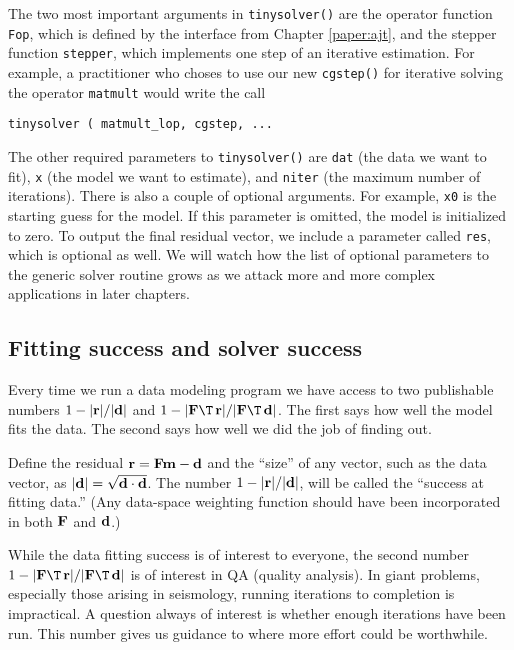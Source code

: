 \par
The two most important arguments in \texttt{tinysolver()}
are the operator function \texttt{Fop},
which is defined by the interface from Chapter \ref{paper:ajt},
and the stepper function \texttt{stepper},
which implements one step of an iterative estimation.
For example, a practitioner who choses to use our new
\texttt{cgstep()} 
for iterative solving the operator
\texttt{matmult} 
would write the call
\par
\texttt{tinysolver ( matmult\_lop, cgstep, ...}
\par
The other required parameters to \texttt{tinysolver()} 
are \texttt{dat} (the data we want to fit),
\texttt{x} (the model we want to estimate),
and \texttt{niter} (the maximum number of iterations).
There is also a couple of optional arguments.
For example, \texttt{x0} is the starting guess for the model.
If this parameter is omitted, the model is initialized to zero.
To output the final residual vector,
we include a parameter called \texttt{res},
which is optional as well.
We will watch how the list of optional parameters
to the generic solver routine grows
as we attack more and more complex applications in later chapters.

\subsection{Fitting success and solver success}
Every time we run a data modeling program
we have access to two publishable numbers
$1-|\bold r|/|\bold d|$ and
$1-|\bold F\T\,\bold r|/|\bold F\T\,\bold d|$.
The first says how well the model fits the data.
The second says how well we did the job of finding out.
\par
Define the residual $\bold r=\bold F\bold m-\bold d$ and
the ``size'' of any vector, such as the data vector,
as $|\bold d|=\sqrt{\bold d \cdot \bold d}$.
The number $1-|\bold r|/|\bold d|$, will be called the
``success at fitting data.''
(Any data-space weighting function
should have been incorporated in both $\bold F$ and $\bold d$.)
\par
While the data fitting success is of interest to everyone,
the second number
$1-|\bold F\T\,\bold r|/|\bold F\T\,\bold d|$
is of interest in QA (quality analysis).
In giant problems,
especially those arising in seismology,
running iterations to completion is impractical.
A question always of interest is whether enough iterations have been run.
This number gives us guidance to where more effort could be worthwhile.
\par
{}



